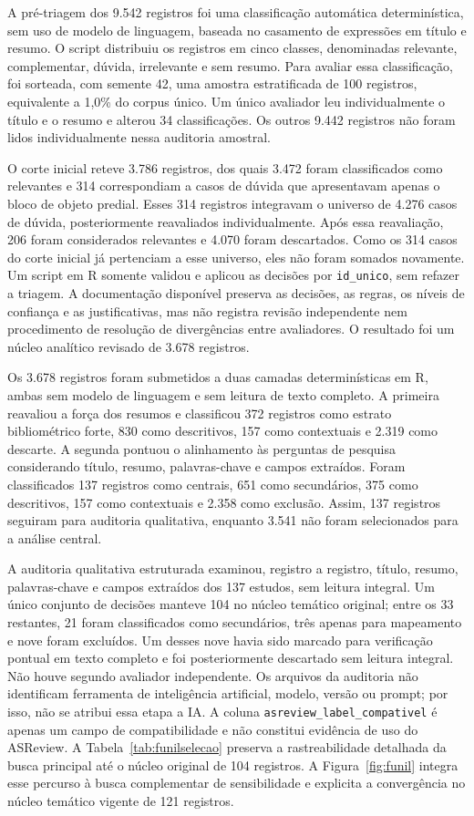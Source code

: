 A pré-triagem dos 9.542 registros foi uma classificação automática determinística, sem uso de modelo de linguagem, baseada no casamento de expressões em título e resumo. O script distribuiu os registros em cinco classes, denominadas relevante, complementar, dúvida, irrelevante e sem resumo. Para avaliar essa classificação, foi sorteada, com semente 42, uma amostra estratificada de 100 registros, equivalente a 1,0\% do corpus único. Um único avaliador leu individualmente o título e o resumo e alterou 34 classificações. Os outros 9.442 registros não foram lidos individualmente nessa auditoria amostral.

O corte inicial reteve 3.786 registros, dos quais 3.472 foram classificados como relevantes e 314 correspondiam a casos de dúvida que apresentavam apenas o bloco de objeto predial. Esses 314 registros integravam o universo de 4.276 casos de dúvida, posteriormente reavaliados individualmente. Após essa reavaliação, 206 foram considerados relevantes e 4.070 foram descartados. Como os 314 casos do corte inicial já pertenciam a esse universo, eles não foram somados novamente. Um script em R somente validou e aplicou as decisões por \texttt{id\_unico}, sem refazer a triagem. A documentação disponível preserva as decisões, as regras, os níveis de confiança e as justificativas, mas não registra revisão independente nem procedimento de resolução de divergências entre avaliadores. O resultado foi um núcleo analítico revisado de 3.678 registros.

Os 3.678 registros foram submetidos a duas camadas determinísticas em R, ambas sem modelo de linguagem e sem leitura de texto completo. A primeira reavaliou a força dos resumos e classificou 372 registros como estrato bibliométrico forte, 830 como descritivos, 157 como contextuais e 2.319 como descarte. A segunda pontuou o alinhamento às perguntas de pesquisa considerando título, resumo, palavras-chave e campos extraídos. Foram classificados 137 registros como centrais, 651 como secundários, 375 como descritivos, 157 como contextuais e 2.358 como exclusão. Assim, 137 registros seguiram para auditoria qualitativa, enquanto 3.541 não foram selecionados para a análise central.

A auditoria qualitativa estruturada examinou, registro a registro, título, resumo, palavras-chave e campos extraídos dos 137 estudos, sem leitura integral. Um único conjunto de decisões manteve 104 no núcleo temático original; entre os 33 restantes, 21 foram classificados como secundários, três apenas para mapeamento e nove foram excluídos. Um desses nove havia sido marcado para verificação pontual em texto completo e foi posteriormente descartado sem leitura integral. Não houve segundo avaliador independente. Os arquivos da auditoria não identificam ferramenta de inteligência artificial, modelo, versão ou prompt; por isso, não se atribui essa etapa a IA. A coluna \texttt{asreview\_label\_compativel} é apenas um campo de compatibilidade e não constitui evidência de uso do ASReview. A Tabela~\ref{tab:funilselecao} preserva a rastreabilidade detalhada da busca principal até o núcleo original de 104 registros. A Figura~\ref{fig:funil} integra esse percurso à busca complementar de sensibilidade e explicita a convergência no núcleo temático vigente de 121 registros.

